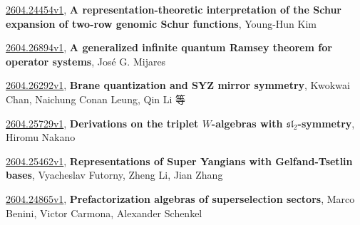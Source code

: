 \documentclass[9pt, a4paper]{article}
\theoremstyle{plain}
\theoremstyle{definition}
\theoremstyle{remark}
\newcommand{\arxiv}[3]{\href{https://arxiv.org/abs/#1}{#1}, \textbf{\textcolor{arxivblue}{#2}}, #3}
\begin{document}
\arxiv{2604.24454v1}{A representation-theoretic interpretation of the Schur expansion of two-row genomic Schur functions}{Young-Hun Kim}

\arxiv{2604.26894v1}{A generalized infinite quantum Ramsey theorem for operator systems}{José G. Mijares}

\arxiv{2604.26292v1}{Brane quantization and SYZ mirror symmetry}{Kwokwai Chan, Naichung Conan Leung, Qin Li 等}

\arxiv{2604.25729v1}{Derivations on the triplet $W$-algebras with $\mathfrak{sl}_2$-symmetry}{Hiromu Nakano}

\arxiv{2604.25462v1}{Representations of Super Yangians with Gelfand-Tsetlin bases}{Vyacheslav Futorny, Zheng Li, Jian Zhang}

\arxiv{2604.24865v1}{Prefactorization algebras of superselection sectors}{Marco Benini, Victor Carmona, Alexander Schenkel}

\end{document}
